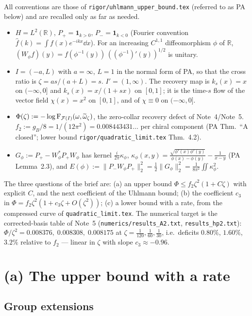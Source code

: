 \documentclass[11pt]{article}
\newcommand{\Pp}{P_+}\newcommand{\Pm}{P_-}
\newcommand{\one}{\mathbf 1}
\newcommand{\norm}[1]{\lVert#1\rVert}
\begin{document}
All conventions are those of \texttt{rigor/uhlmann\_upper\_bound.tex} (referred to as PA below) and
are recalled only as far as needed.

\begin{itemize}\itemsep2pt
\item $H=L^2(\mathbb R)$, $\Pp=\one_{k>0}$, $\Pm=\one_{k<0}$ (Fourier convention
 $\hat f(k)=\int f(x)e^{-ikx}\dd x$).  For an increasing $C^{1,1}$ diffeomorphism $\phi$ of
 $\mathbb R$, $(W_\phi f)(y)=f(\phi^{-1}(y))\,((\phi^{-1})'(y))^{1/2}$ is unitary.
\item $I=(-a,L)$ with $a=\infty$, $L=1$ in the normal form of PA, so that the cross ratio is
 $\zeta=as/(a+L)=s$.  $I'=(1,\infty)$.  The recovery map is $k_s(x)=x$ on $(-\infty,0]$ and
 $k_s(x)=x/(1+sx)$ on $[0,1]$; it is the time-$s$ flow of the vector field $\chi(x)=x^2$ on
 $[0,1]$, and of $\chi\equiv0$ on $(-\infty,0]$.
\item $\Phi(\zeta):=-\log\operatorname{F}_{\mathcal F(I)}(\omega,\widetilde\omega_\zeta)$, the zero-collar recovery
 defect of Note~4/Note~5.  $f_2:=g_B/8=1/(12\pi^2)=0.008443431\ldots$ per chiral component
 (PA Thm.~``A closed''; lower bound \texttt{rigor/quadratic\_limit.tex} Thm.~4.2).
\item $G_\phi:=\Pp-W_\phi^*\Pp W_\phi$ has kernel $\frac i{2\pi}\kappa_\phi$,
 $\kappa_\phi(x,y)=\frac{\sqrt{\phi'(x)\phi'(y)}}{\phi(x)-\phi(y)}-\frac1{x-y}$
 (PA Lemma~2.3), and $E(\phi):=\norm{\Pm W_\phi\Pp}_2^2=\frac12\norm{G_\phi}_2^2
 =\frac1{8\pi^2}\iint\kappa_\phi^2$.
\end{itemize}

The three questions of the brief are: (a) an upper bound $\Phi\le f_2\zeta^2(1+C\zeta)$ with
explicit $C$, and the next coefficient of the Uhlmann bound; (b) the coefficient $c_3$ in
$\Phi=f_2\zeta^2(1+c_3\zeta+O(\zeta^2))$; (c) a lower bound with a rate, from the compressed
curve of \texttt{quadratic\_limit.tex}.  The numerical target is the corrected-basis table of
Note~5 (\texttt{numerics/results\_A2.txt}, \texttt{results\_hp2.txt}):
$\Phi/\zeta^2=0.008376,\;0.008308,\;0.008175$ at $\zeta=\frac1{120},\frac1{60},\frac1{30}$,
i.e.\ deficits $0.80\%$, $1.60\%$, $3.2\%$ relative to $f_2$ --- linear in $\zeta$ with slope
$c_3\approx-0.96$.

\section{(a) The upper bound with a rate}\label{sec:a}

\subsection{Group extensions}
\end{document}
